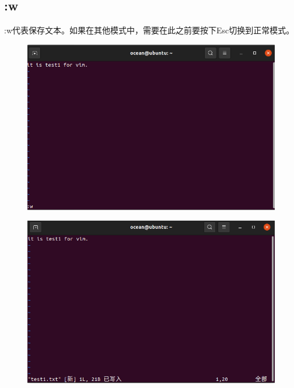 \documentclass{article}
\begin{document}
\subsection{:w}
:w代表保存文本。如果在其他模式中，需要在此之前要按下Esc切换到正常模式。
\begin{figure}[H]
    \centering
    \includegraphics[width=1\linewidth]{w.png}
\end{figure}
\begin{figure}[H]
    \centering
    \includegraphics[width=1\linewidth]{w2.png}
\end{figure}
\end{document}
